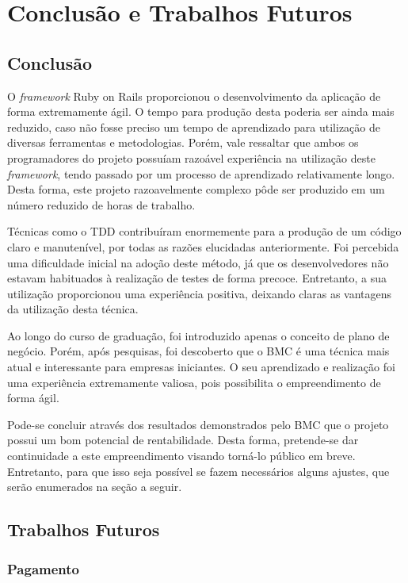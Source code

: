 \chapter{Conclusão e Trabalhos Futuros}

\section{Conclusão}

O \textit{framework} Ruby on Rails proporcionou o desenvolvimento da aplicação de forma extremamente ágil. O tempo para produção desta poderia ser ainda mais reduzido, caso não fosse preciso um tempo de aprendizado para utilização de diversas ferramentas e metodologias. Porém, vale ressaltar que ambos os programadores do projeto possuíam razoável experiência na utilização deste \textit{framework}, tendo passado por um processo de aprendizado relativamente longo. Desta forma, este projeto razoavelmente complexo pôde ser produzido em um número reduzido de horas de trabalho.

Técnicas como o TDD contribuíram enormemente para a produção de um código claro e manutenível, por todas as razões elucidadas anteriormente. Foi percebida uma dificuldade inicial na adoção deste método, já que os desenvolvedores não estavam habituados à realização de testes de forma precoce. Entretanto, a sua utilização proporcionou uma experiência positiva, deixando claras as vantagens da utilização desta técnica.

Ao longo do curso de graduação, foi introduzido apenas o conceito de plano de negócio. Porém, após pesquisas, foi descoberto que o BMC é uma técnica mais atual e interessante para empresas iniciantes. O seu aprendizado e realização foi uma experiência extremamente valiosa, pois possibilita o empreendimento de forma ágil.

Pode-se concluir através dos resultados demonstrados pelo BMC que o projeto possui um bom potencial de rentabilidade. Desta forma, pretende-se dar continuidade a este empreendimento visando torná-lo público em breve. Entretanto, para que isso seja possível se fazem necessários alguns ajustes, que serão enumerados na seção a seguir.

\section{Trabalhos Futuros}

\subsection{Pagamento}

